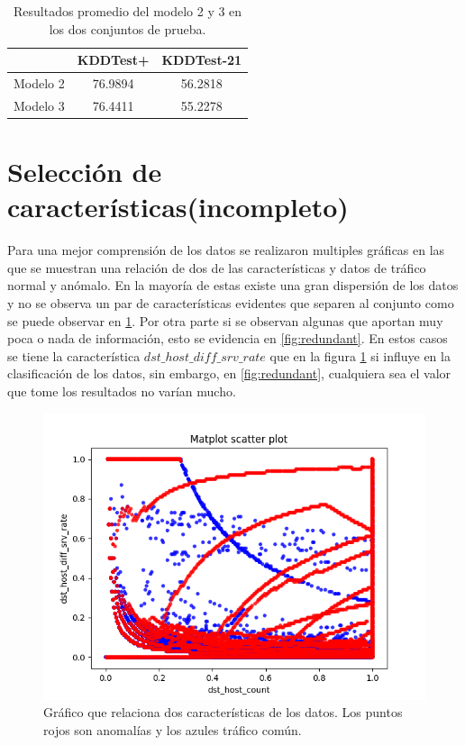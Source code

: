 \begin{table}[h]
    \begin{center}
        \caption{Resultados promedio del modelo 2 y 3 en los dos conjuntos de prueba.}

        \label{tab:model23_results}
        \begin{tabular}{c|c|c} %
        \textbf{} & \textbf{KDDTest+} & \textbf{KDDTest-21}\\
        \hline
        Modelo 2 & 76.9894 & 56.2818\\
        Modelo 3 & 76.4411 & 55.2278\\
        \end{tabular}
    \end{center}
\end{table}


\section{Selección de características(incompleto)}

Para una mejor comprensión de los datos se realizaron multiples gráficas en las que se muestran una relación de dos de las características y datos de tráfico normal y anómalo. En la mayoría de estas existe una gran dispersión de los datos y no se observa un par de características evidentes que separen al conjunto como se puede observar en \ref{fig:entropy}. Por otra parte si se observan algunas que aportan muy poca o nada de información, esto se evidencia en \ref{fig:redundant}. En estos casos se tiene la característica $dst\_host\_diff\_srv\_rate$ que en la figura \ref{fig:entropy} si influye en la clasificación de los datos, sin embargo, en \ref{fig:redundant}, cualquiera sea el valor que tome los resultados no varían mucho.

\begin{figure}[b]
    \includegraphics[width=\linewidth]{Images/dst_host_count-dst_host_diff_srv_rate.png}
    \caption{Gráfico que relaciona dos características de los datos. Los puntos rojos son anomalías y los azules tráfico común.}
    \label{fig:entropy}
\end{figure}

